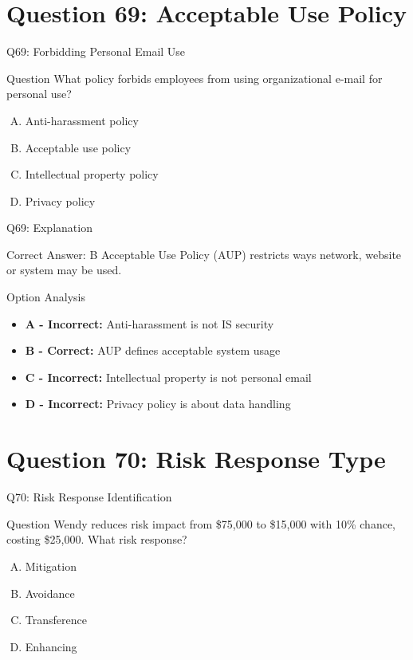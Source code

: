 \documentclass{beamer}
\begin{document}
	
	
	
	
	
	
	\section{Question 69: Acceptable Use Policy}
	
	\begin{frame}{Q69: Forbidding Personal Email Use}
		\begin{block}{Question}
			What policy forbids employees from using organizational e-mail for personal use?
		\end{block}
		\begin{enumerate}[(A)]
			\item Anti-harassment policy
			\item Acceptable use policy
			\item Intellectual property policy
			\item Privacy policy
		\end{enumerate}
	\end{frame}
	
	\begin{frame}{Q69: Explanation}
		\begin{block}{Correct Answer: B}
			Acceptable Use Policy (AUP) restricts ways network, website or system may be used.
		\end{block}
		\begin{block}{Option Analysis}
			\begin{itemize}
				\item \textbf{A - Incorrect:} Anti-harassment is not IS security
				\item \textbf{B - Correct:} AUP defines acceptable system usage
				\item \textbf{C - Incorrect:} Intellectual property is not personal email
				\item \textbf{D - Incorrect:} Privacy policy is about data handling
			\end{itemize}
		\end{block}
	\end{frame}
	
	\section{Question 70: Risk Response Type}
	
	\begin{frame}{Q70: Risk Response Identification}
		\begin{block}{Question}
			Wendy reduces risk impact from \$75,000 to \$15,000 with 10\% chance, costing \$25,000. What risk response?
		\end{block}
		\begin{enumerate}[(A)]
			\item Mitigation
			\item Avoidance
			\item Transference
			\item Enhancing
		\end{enumerate}
	\end{frame}
	
\end{document}
